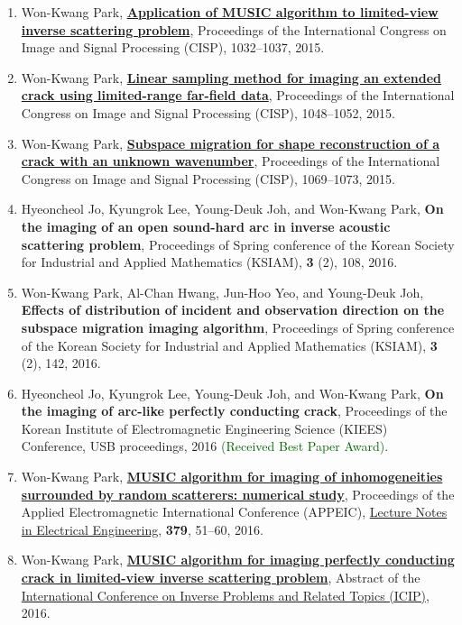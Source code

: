 \documentclass[10pt,A4]{article}
\begin{document}
\begin{enumerate}
\item\label{C-CISP2015A} Won-Kwang Park, \href{http://dx.doi.org/10.1109/CISP.2015.7408031}{\textbf{Application of MUSIC algorithm to limited-view inverse scattering problem}}, Proceedings of the  International Congress on Image and Signal Processing (CISP), 1032--1037, 2015.
\item\label{C-CISP2015B} Won-Kwang Park, \href{http://dx.doi.org/10.1109/CISP.2015.7408034}{\textbf{Linear sampling method for imaging an extended crack using limited-range far-field data}}, Proceedings of the  International Congress on Image and Signal Processing (CISP), 1048--1052, 2015.
\item\label{C-CISP2015C} Won-Kwang Park, \href{http://dx.doi.org/10.1109/CISP.2015.7408038}{\textbf{Subspace migration for shape reconstruction of a crack with an unknown wavenumber}}, Proceedings of the  International Congress on Image and Signal Processing (CISP), 1069--1073, 2015.
\item\label{C-KSIAM2016A} Hyeoncheol Jo, Kyungrok Lee, Young-Deuk Joh, and Won-Kwang Park, \textbf{On the imaging of an open sound-hard arc in inverse acoustic scattering problem}, Proceedings of Spring conference of the Korean Society for Industrial and Applied Mathematics (KSIAM), \textbf{3} (2), 108, 2016.
\item\label{C-KSIAM2016B} Won-Kwang Park, Al-Chan Hwang, Jun-Hoo Yeo, and Young-Deuk Joh, \textbf{Effects of distribution of incident and observation direction on the subspace migration imaging algorithm}, Proceedings of Spring conference of the Korean Society for Industrial and Applied Mathematics (KSIAM), \textbf{3} (2), 142, 2016.
\item\label{C-KIEES2016} Hyeoncheol Jo, Kyungrok Lee, Young-Deuk Joh, and Won-Kwang Park, \textbf{On the imaging of arc-like perfectly conducting crack}, Proceedings of the Korean Institute of Electromagnetic Engineering Science (KIEES) Conference, USB proceedings, 2016 \textcolor{darkgreen}{(Received Best Paper Award)}.
\item\label{C-APPEIC2016} Won-Kwang Park, \textbf{\href{http://dx.doi.org/10.1007/978-3-319-30117-4_5}{MUSIC algorithm for imaging of inhomogeneities surrounded by random scatterers: numerical study}}, Proceedings of the  Applied Electromagnetic International Conference (APPEIC), \href{http://www.springer.com/series/7818}{Lecture Notes in Electrical Engineering}, \textbf{379}, 51--60, 2016.
\item\label{C-ICIP2016} Won-Kwang Park, \href{http://math.ewha.ac.kr/icip2016/UpLoad/parkwk=kookmin=ac-0.pdf}{\textbf{MUSIC algorithm for imaging perfectly conducting crack in limited-view inverse scattering problem}}, Abstract of the \href{http://math.ewha.ac.kr/icip2016/}{ International Conference on Inverse Problems and Related Topics (ICIP)}, 2016.

\end{enumerate}
\end{document}
